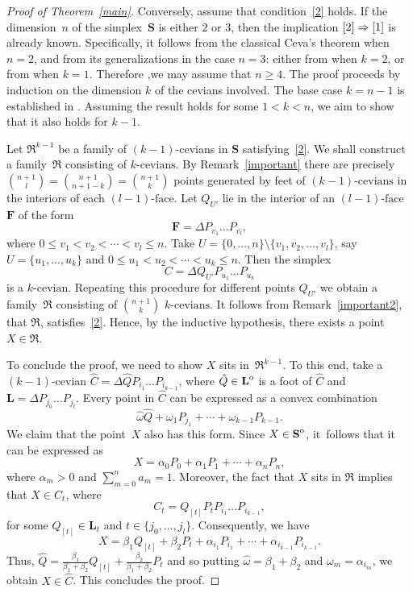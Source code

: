 \documentclass[12pt, reqno]{amsart}
\theoremstyle{definition}
\theoremstyle{remark}
\numberwithin{equation}{section}
\newcommand{\interior}[1]{%
  {\kern0pt#1}^{\mathrm{o}}%
}
\begin{document}
{\begin{proof}[Proof of Theorem~\ref{main}]
Conversely, assume that condition~\eqref{2} holds. If the dimension~$n$ of the simplex~$\mathbf{S}$ is either $2$ or $3$, then the implication $\eqref{2} \Rightarrow \eqref{1}$ is already known. Specifically, it follows from the classical Ceva’s theorem when $n = 2$, and from its generalizations in the case $n = 3$: either from \cite{Buba-Brzozowa, Witczynski} when $k = 2$, or from \cite{Samet} when $k = 1$. Therefore ,we may assume that $n \geq 4$. The proof proceeds by induction on the dimension $k$ of the cevians involved. The base case $k = n-1$ is established in \cite{Buba-Brzozowa}. Assuming the result holds for some $1 < k < n$, we aim to show that it also holds for $k - 1$.
  
Let $\mathfrak{R}^{k-1}$ be a family of $(k-1)$-cevians in $\mathbf{S}$ satisfying~\eqref{2}. We shall construct a family~$\mathfrak{R}$ consisting of $k\mbox{-cevians}$. By Remark~\ref{important} there are precisely ${n+1 \choose l}={n+1 \choose n+1-k}={n+1 \choose k}$ points generated by feet of $(k-1)\mbox{-cevians}$ in the interiors of each $(l-1)\mbox{-face}$.  Let $Q_{U'}$ lie in the interior of an $(l-1)\mbox{-face}$ $\mathbf{F}$ of the form 
\[
\mathbf{F}=\Delta P_{v_1}...P_{v_l},
\]
where $0\leq v_1<v_2< \dotsb <v_{l}\leq n$. Take $U= \{0,\dotsc ,n\}\setminus\{v_1,v_2,\dotsc, v_{l}\}$, say $U=\{u_{1},...,u_k\}$ and $0\leq u_1<u_2< \dotsb <u_{k}\leq n$. Then the simplex 
\[
C=\Delta Q_{U'}P_{u_1}...P_{u_k}
\]
is a $k\mbox{-cevian}$. Repeating this procedure for different points $Q_{U'}$ we obtain a family~$\mathfrak{R}$ consisting of  $n+1 \choose k$ $k\mbox{-cevians}$. It follows from Remark~\ref{important2}, that $\mathfrak{R}$, satisfies~\eqref{2}. Hence, by the inductive hypothesis, there exists a point $X\in \mathfrak{R}$. 
  
To conclude the proof, we need to show $X$ sits in~$\mathfrak{R}^{k-1}$. To this end, take a  $(k-1)$-cevian $\hat{C}=\Delta\hat{Q}P_{i_1}\dotsc P_{i_{k-1}}$, where $\hat{Q}\in\interior{\mathbf{L}}$ is a foot of $\hat{C}$ and $\mathbf{L}={\Delta P_{j_0}\dotsc P_{j_l}}$. Every point in $\hat{C}$ can be expressed as a convex combination 
\[
\hat \omega \hat Q+\omega_1P_{j_1}+ \dotsb +\omega_{k-1}P_{k-1}.
\]
We claim that the point~$X$ also has this form. Since $X\in\interior{\mathbf{S}}$, it~follows that it can be expressed as
\[
X=\alpha_0P_0+\alpha_1P_1+ \dotsb +\alpha_nP_n,
\]
where $\alpha_m>0$ and $\sum^n_{m=0}a_m=1$. Moreover, the fact that $X$ sits in $\mathfrak{R}$ implies that $X\in C_t$, where 
\[
C_t=Q_{[t]}P_tP_{i_1}\dotsc P_{i_{k-1}},
\]
for some $Q_{[t]}\in\mathbf{L}_t$ and $t\in\{j_0,\dotsc ,j_l\}$. Consequently, we have 
\[
X=\beta_1Q_{[t]}+\beta_2P_t+\alpha_{i_1}P_{i_{1}}+\dotsb +\alpha_{i_{k-1}}P_{i_{k-1}}.
\]
Thus, $\hat{Q}=\frac{\beta_1}{\beta_1+\beta_2} Q_{[t]}+\frac{\beta_2}{\beta_1+\beta_2}P_t$ and so putting $\hat \omega=\beta_1+\beta_2$ and $\omega_m=\alpha_{i_{m}}$, we obtain $X\in \hat{C}$. This concludes the proof.
\end{proof}

}
\end{document}
